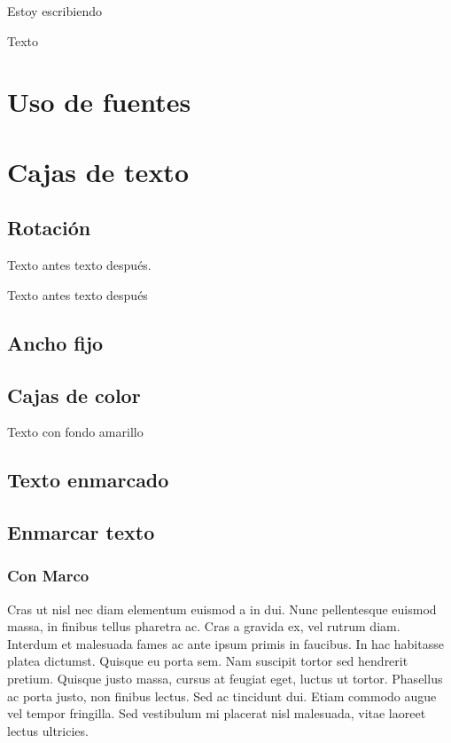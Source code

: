 \documentclass[b5paper, 10pt]{book}
\begin{document}
	
	
	\noindent Estoy 
	escribiendo 
	
	Texto
\section {Uso de fuentes}	
	
	
\section {Cajas de texto}
\subsection {Rotación}
\label{rotacion}
Texto antes  texto después. 

{\scriptsize
Texto antes  texto después}

\subsection{Ancho fijo}


\subsection{Cajas de color}
\colorbox{micolor}{Texto con fondo amarillo}

\subsection{Texto enmarcado}

\subsection{Enmarcar texto}
\subsubsection{Con Marco}
\begin{framed}
Cras ut nisl nec diam elementum euismod a in dui. Nunc pellentesque euismod massa, in finibus tellus pharetra ac. Cras a gravida ex, vel rutrum diam. Interdum et malesuada fames ac ante ipsum primis in faucibus. In hac habitasse platea dictumst. Quisque eu porta sem. Nam suscipit tortor sed hendrerit pretium. Quisque justo massa, cursus at feugiat eget, luctus ut tortor. Phasellus ac porta justo, non finibus lectus. Sed ac tincidunt dui. Etiam commodo augue vel tempor fringilla. Sed vestibulum mi placerat nisl malesuada, vitae laoreet lectus ultricies.
\end{framed}
\end{document}
